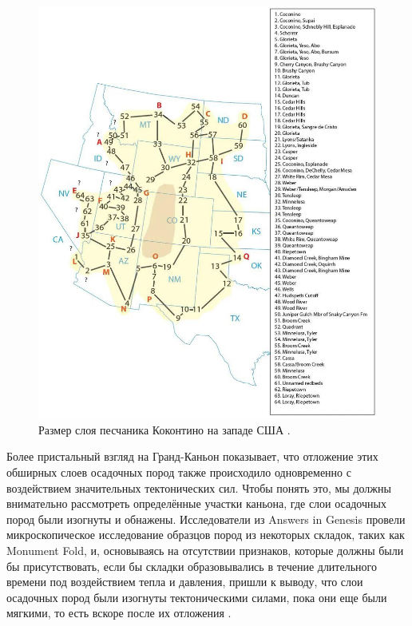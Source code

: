 \documentclass[10pt,twocolumn,letterpaper]{article}
\begin{document}
\begin{figure}[t]
\begin{center}
   \includegraphics[width=1\linewidth]{coconino.jpg}
\end{center}
   \caption{Размер слоя песчаника Коконтино на западе США \cite{21}.}
\label{fig:3}
\label{fig:onecol}
\end{figure}

Более пристальный взгляд на Гранд-Каньон показывает, что отложение этих обширных слоев осадочных пород также происходило одновременно с воздействием значительных тектонических сил. Чтобы понять это, мы должны внимательно рассмотреть определённые участки каньона, где слои осадочных пород были изогнуты и обнажены. Исследователи из Answers in Genesis \cite{42} провели микроскопическое исследование образцов пород из некоторых складок, таких как Monument Fold, и, основываясь на отсутствии признаков, которые должны были бы присутствовать, если бы складки образовывались в течение длительного времени под воздействием тепла и давления, пришли к выводу, что слои осадочных пород были изогнуты тектоническими силами, пока они еще были мягкими, то есть вскоре после их отложения \cite{43}.
\end{document}
